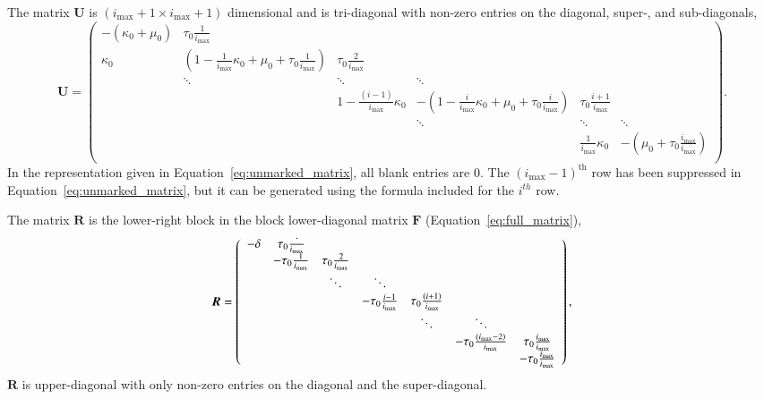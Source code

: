 \documentclass[review]{elsarticle}
\newcommand{\imax}{\ensuremath{i_{\max}}\xspace}
\let\bs\boldsymbol
\begin{document}
The matrix $\bs{U}$ is $(\imax+1\times \imax+1)$ dimensional and is tri-diagonal with non-zero entries on the diagonal, super-, and sub-diagonals,
\begin{equation}
\label{eq:unmarked_matrix}
\bs{U}=\left(\begin{array}{cccccc}
-(\kappa_0+\mu_0) & \tau_0\frac{1}{\imax} &  &  &  & \\
\kappa_0 & \left(1-\frac{1}{\imax} \kappa_0+\mu_0+\tau_0\frac{1}{\imax}\right) & \tau_0\frac{2}{\imax} &  &  & \\
   &\ddots        & \ddots        & \ddots & &  \\
   & &    1-\frac{(i-1)}{\imax}\kappa_0 & -\left(1-\frac{i}{\imax}\kappa_0+\mu_0+\tau_0\frac{i}{\imax}\right) & \tau_0\frac{i+1}{\imax} & \\
                  &         &        & \ddots  & \ddots & \ddots \\
     
                          &        &  &  & \frac{1}{\imax}\kappa_0 & -\left(\mu_0+\tau_0\frac{\imax}{\imax}\right) \\
\end{array}\right).
\end{equation}
In the representation given in Equation~\ref{eq:unmarked_matrix}, all blank entries are 0.
The $(\imax-1)^{\text{th}}$ row has been suppressed in Equation~\ref{eq:unmarked_matrix}, but it can be generated using the formula included for the $i^{th}$ row.

The matrix $\bs{R}$ is the lower-right block in the block lower-diagonal matrix $\bs{F}$ (Equation~\ref{eq:full_matrix}),
\begin{equation}
\label{eq:marked_matrix}
\bs{R}=\left(
\begin{array}{ccccccc}
-\delta & \tau_0\frac{`}{\imax} & & & & & \\
 & -\tau_0\frac{1}{\imax} & \tau_0\frac{2}{\imax} & & & &\\
 & & \ddots & \ddots & & & \\
 & & & -\tau_0\frac{i-1}{\imax} & \tau_0\frac{(i+1)}{\imax} & & \\
 & & & & \ddots & \ddots & \\
 & & & & & -\tau_0\frac{(\imax-2)}{\imax} & \tau_0\frac{\imax}{\imax} \\
 & & & & & & -\tau_0\frac{\imax}{\imax} \\
\end{array}
\right),
\end{equation}
$\bs{R}$ is upper-diagonal with only non-zero entries on the diagonal and the super-diagonal.
\end{document}
